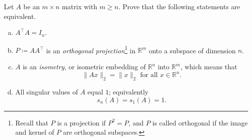 \begin{problem*}[Exercise 4.1.4]\label{ex4.1.4}
	Let \(A\) be an \(m \times n\) matrix with \(m \geq n\). Prove that the following statements are equivalent.
	\begin{enumerate}[(a)]
		\item\label{ex4.1.4:a} \(A ^{\top} A = I_n\).
		\item\label{ex4.1.4:b} \(P \coloneqq A A^{\top} \) is an \emph{orthogonal projection}\footnote{Recall that \(P\) is a projection if \(P^2 = P\), and \(P\) is called orthogonal if the image and kernel of \(P\) are orthogonal subspaces.} in \(\mathbb{R} ^m\) onto a subspace of dimension \(n\).
		\item\label{ex4.1.4:c} \(A\) is an \emph{isometry}, or isometric embedding of \(\mathbb{R} ^n\) into \(\mathbb{R} ^m\), which means that
		      \[
			      \lVert Ax \rVert _2
			      = \lVert x \rVert _2
			      \text{ for all } x \in \mathbb{R} ^n.
		      \]
		\item\label{ex4.1.4:d} All singular values of \(A\) equal \(1\); equivalently
		      \[
			      s_n (A)
			      = s_1 (A)
			      = 1.
		      \]
	\end{enumerate}
\end{problem*}
